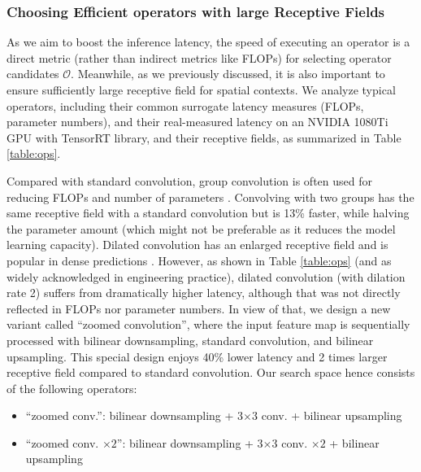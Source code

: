 \documentclass{article} \usepackage{iclr2020_conference,times}
\begin{document}
\subsubsection{Choosing Efficient operators with large Receptive Fields}


As we aim to boost the inference latency, the speed of executing an operator is a direct metric (rather than indirect metrics like FLOPs) for selecting operator candidates $\mathcal{O}$. Meanwhile, as we previously discussed, it is also important to ensure sufficiently large receptive field for spatial contexts. 
We analyze typical operators, including their common surrogate latency measures (FLOPs, parameter numbers), and their real-measured latency on an NVIDIA 1080Ti GPU with TensorRT library, and their receptive fields, as summarized in Table \ref{table:ops}.


Compared with standard convolution, group convolution is often used for reducing FLOPs and number of parameters \citep{sandler2018mobilenetv2,ma2018shufflenet}. Convolving with two groups has the same receptive field with a standard convolution but is 13\% faster, while halving the parameter amount (which might not be preferable as it reduces the model learning capacity). 
Dilated convolution has an enlarged receptive field and is popular in dense predictions \citep{chen2018encoder,dai2017deformable}. However, as shown in Table \ref{table:ops} (and as widely acknowledged in engineering practice), dilated convolution (with dilation rate 2) suffers from dramatically higher latency, although that was not directly reflected in FLOPs nor parameter numbers. In view of that, we design a new variant called ``zoomed convolution'', where the input feature map is sequentially processed with bilinear downsampling, standard convolution, and bilinear upsampling. This special design enjoys 40\% lower latency and 2 times larger receptive field compared to standard convolution. 
Our search space hence consists of the following operators:\vspace{-0.9em}
\begin{itemize}
     \vspace{-1.5em}
    \item ``zoomed conv.'': bilinear downsampling + 3$\times$3 conv. + bilinear upsampling\vspace{-0.5em}
    \item ``zoomed conv. $\times 2$'':  bilinear downsampling + 3$\times$3 conv. $\times 2$ + bilinear upsampling
\end{itemize}\vspace{-0.5em}
\end{document}
